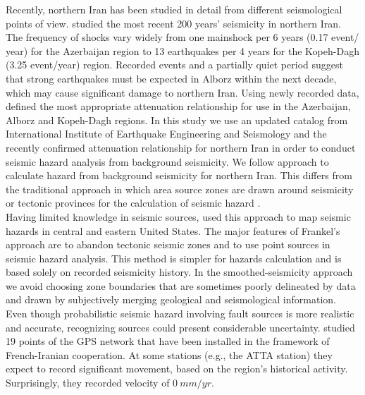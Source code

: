 \noindent
Recently, northern Iran has been studied in detail from different seismological points of view. \citet{Nemati2015} studied the most recent 200 years' seismicity in northern Iran. The frequency of shocks vary widely from one mainshock per 6 years (0.17 event/ year) for the Azerbaijan region to 13 earthquakes per 4 years for the Kopeh-Dagh (3.25 event/year) region. Recorded events and a partially quiet period suggest that strong earthquakes must be expected in Alborz within the next decade, which may cause significant damage to northern Iran. Using newly recorded data, \citet{Zafarani2014} defined the most appropriate attenuation relationship for use in the Azerbaijan, Alborz and Kopeh-Dagh regions. In this study we use an updated catalog from International Institute of Earthquake Engineering and Seismology \citep{IIEES} and the recently confirmed attenuation relationship for northern Iran \citep[i.e.,][]{Kalkan2004} in order to conduct seismic hazard analysis from background seismicity. We follow \citet{Frankel1995} approach to calculate hazard from background seismicity for northern Iran. This differs from the traditional approach in which area source zones are drawn around seismicity or tectonic provinces for the calculation of seismic hazard \citep{Cornell1968}. \\
\noindent
Having limited knowledge in seismic sources, \citet{Frankel1995} used this approach to map seismic hazards in central and eastern United States. The major features of Frankel's approach are to abandon tectonic seismic zones and to use point sources in seismic hazard analysis. This method is simpler for hazards calculation and is based solely on recorded seismicity history. In the smoothed-seismicity approach we avoid choosing zone boundaries that are sometimes poorly delineated by data and drawn by subjectively merging geological and seismological information. Even though probabilistic seismic hazard involving fault sources is more realistic and accurate, recognizing sources could present considerable uncertainty. \citet{Masson2006} studied 19 points of the GPS network that have been installed in the framework of French-Iranian cooperation. At some stations (e.g., the ATTA station) they expect to record significant movement, based on the region's historical activity.  Surprisingly, they recorded velocity of $0\  mm/yr$. \\
\noindent
